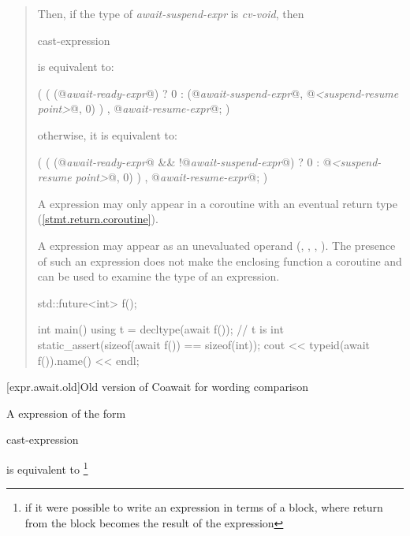 \begin{quote}
Then, if the type of \textit{await-suspend-expr} is \textit{cv-void}, then

\begin{ncbnf}
   cast-expression
\end{ncbnf}
is equivalent to:
\begin{codeblock}
(
  ( 
    (@\textit{await-ready-expr}@) ? 0
    : (@\textit{await-suspend-expr}@, @\textit{<suspend-resume point>}@, 0)
  )
  , @\textit{await-resume-expr}@;
)
\end{codeblock}

otherwise, it is equivalent to:

\begin{codeblock}
(
  ( 
    (@\textit{await-ready-expr}@ && !@\textit{await-suspend-expr}@) ? 0
    : @\textit{<suspend-resume point>}@, 0)
  )
  , @\textit{await-resume-expr}@;
)
\end{codeblock}

\pnum
A  expression may only appear in a coroutine 
with an eventual return type (\ref{stmt.return.coroutine}).

\pnum
\enternote
A  expression may appear as an unevaluated operand (, , , ). The presence of such an  expression does not make the enclosing function a coroutine and can be used to examine the type of an  expression.

\enterexample
\begin{codeblock}	
  std::future<int> f();
  
  int main() {
    using t = decltype(await f()); // t is int
    static_assert(sizeof(await f()) == sizeof(int));
    cout << typeid(await f()).name() << endl;
  }
\end{codeblock}
\exitexample%
\exitnote

\end{quote}

[expr.await.old]{Old version of Coawait for wording comparison}

\pnum
A  expression of the form

\begin{ncbnf}
	 cast-expression
\end{ncbnf}
is equivalent to \footnote{if it were possible to write
an expression in terms of a block, where return from the 
block becomes the result of the expression}

